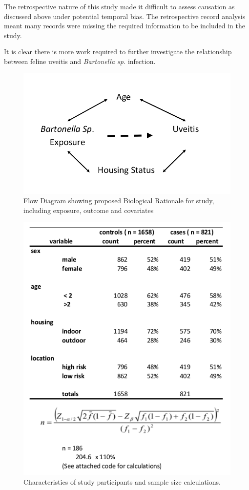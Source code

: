 \documentclass[11pt,twocolumn]{article}
\begin{document}
		The retrospective nature of this study made it difficult to assess causation as discussed above under potential temporal bias. The retrospective record analysis meant many records were missing the required information to be included in the study.

		
		It is clear there is more work required to further investigate the relationship between feline uveitis and \emph{Bartonella sp.} infection.
\newpage

\begin{figure}[h!]
	\centering
	\includegraphics[scale=0.3]{figure1.jpg}
	\caption{Flow Diagram showing proposed Biological Rationale for study, including exposure, outcome and covariates }
	\label{fig:1}
\end{figure}

\begin{figure}[h!]
	\centering
	\includegraphics[scale=0.5]{table1.jpg}
	\caption{Characteristics of study participants and sample size calculations.}
	\label{tab:1}
\end{figure}
 
\end{document}
